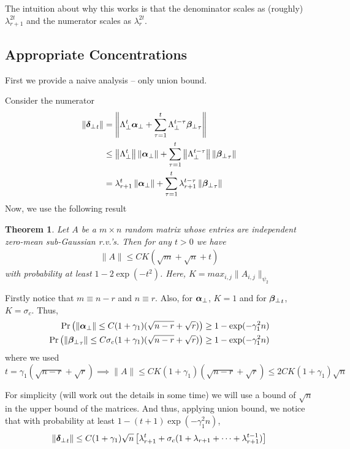 \documentclass[10pt]{article}
\newtheorem{theorem}{Theorem}
\newcommand{\norm}[1]{\left\|#1\right\|}
\begin{document}
The intuition about why this works is that the denominator scales as (roughly) $\lambda_{r+1}^{2t}$ and the numerator scales as $\lambda_{r}^{2t}$. 

\subsection{Appropriate Concentrations}

{\color{blue} First we provide a naive analysis -- only union bound.  }

Consider the numerator 
\begin{align*}
\|\utsin_t\| &= \norm{\Lambda_\perp^t \usin + \sum_{\tau=1}^t \Lambda_\perp^{t-\tau} \wsin_\tau} \\
&\leq \norm{\Lambda_\perp^t} \norm{\usin} + \sum_{\tau=1}^t \norm{\Lambda_\perp^{t-\tau}} \norm{\wsin_\tau} \\
& = \lambda_{r+1}^t \norm{\usin} + \sum_{\tau=1}^t \lambda_{r+1}^{t - \tau} \norm{\wsin_\tau}
\end{align*}
Now, we use the following result \cite[Theorem 4.4.5]{hdp_book} 
\begin{theorem}
Let $A$ be a $m \times n$ random matrix whose entries are independent zero-mean sub-Gaussian r.v.'s. Then for any $t >0$ we have 
\begin{align*}
\|A\| \leq C K (\sqrt{m} + \sqrt{n} + t) 
\end{align*}
with probability at least $1 - 2 \exp(-t^2)$. Here, $K = max_{i,j} \|A_{i,j}\|_{\psi_2}$
\end{theorem}
Firstly notice that $m \equiv n-r$ and $n \equiv r$. Also, for $\bm{\alpha}_{\perp}$, $K = 1$ and for ${\bm{\beta}_{\perp}}_t$, $K = \sigma_c$. Thus, 
\begin{align*}
\Pr\left(\|\bm{\alpha}_{\perp}\| \leq C (1 + \gamma_1)(\sqrt{n-r} + \sqrt{r})\right) \geq  1 - \exp(- \gamma_1^2 n) \\
\Pr\left(\|{\bm{\beta}_{\perp}}_\tau\| \leq C \sigma_c (1 + \gamma_1)(\sqrt{n-r} + \sqrt{r}) \right) \geq  1 - \exp(- \gamma_1^2 n)
\end{align*}
where we used $t = \gamma_1 (\sqrt{n-r} + \sqrt{r}) \implies \|A\| \leq CK (1+ \gamma_1) (\sqrt{n-r} + \sqrt{r}) \leq 2CK (1+ \gamma_1) \sqrt{n}$ 

For simplicity (will work out the  details in some time) we will use a bound of $\sqrt{n}$ in the upper bound of the matrices. And thus, applying union bound, we notice that with probability at least $1 - (t + 1) \exp(- \gamma_1^2 n)$, 
\begin{align*}
\|{\bm{\delta}_{\perp}}_t\| \leq C (1+ \gamma_1) \sqrt{n} \left[\lambda_{r+1}^t +  \sigma_c (1 + \lambda_{r+1} + \cdots +  \lambda_{r+1}^{t-1}) \right]
\end{align*}
\end{document}
